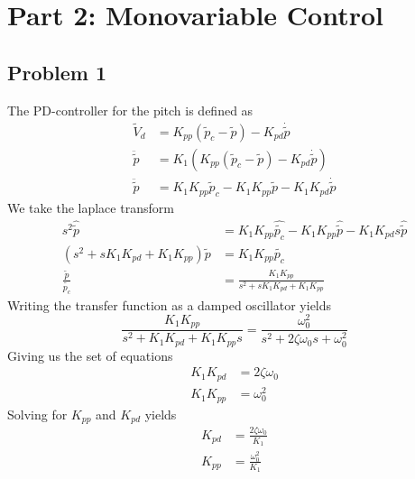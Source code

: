 \section{Part 2: Monovariable Control}

\subsection{Problem 1}

The PD-controller for the pitch is defined as
\begin{subequations}
		\begin{align}
		\tilde V_d &= K_{pp} (\tilde p_c - \tilde p) - K_{pd} \dot {\tilde {p}}\\
		\ddot {\tilde p} &= K_1 (K_{pp} (\tilde p_c - \tilde p) - K_{pd} \dot {\tilde {p}})\\
		\ddot {\tilde p} &= K_1 K_{pp} \tilde p_c - K_1 K_{pp} \tilde p - K_1 K_{pd} \dot {\tilde p}
		\end{align}	
\end{subequations}
We take the laplace transform
\begin{subequations}
		\begin{align}
		s^2 \hat{\tilde{p}} &= K_1 K_{pp} \hat{\tilde {p_c}} - K_1 K_{pp} \hat{\tilde p} - K_1 K_{pd} s \hat {\tilde p} \\
		(s^2 + s K_1 K_{pd} + K_1 K_{pp})\tilde{p} &= K_1 K_{pp} \tilde{p_c} \\
		\frac{\tilde{p}}{\tilde {p_c}} &= \frac{K_1 K_{pp}}{s^2 + s K_1 K_{pd} + K_1 K_{pp}}
		\end{align}
\end{subequations}
Writing the transfer function as a damped oscillator yields
\begin{equation}
	\frac{K_1 K_{pp}}{s^2 + K_1 K_{pd} + K_1 K_{pp} s} = \frac{\omega _0 ^2}{s^2 + 2\zeta \omega_0 s + \omega _0 ^2}
\end{equation}
Giving us the set of equations
\begin{subequations}
		\begin{align}
		K_1 K_{pd}  &= 2\zeta \omega_0 \\
		K_1 K_{pp}  &= \omega _0 ^2
		\end{align}
\end{subequations}
Solving for $K_{pp}$ and $K_{pd}$ yields
\begin{subequations}
		\begin{align}
		K_{pd}  &= \frac{2\zeta \omega_0}{K_1} \label{eq:k1}\\
		K_{pp}  &= \frac{\omega _0 ^2}{K_1} \label{eq:k2}
		\end{align}
\end{subequations}

